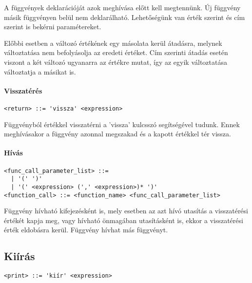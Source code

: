 A függvények deklarációját azok meghívása előtt kell megtennünk. Új függvény másik függvényen belül nem deklarálható. Lehetőségünk van érték szerint és cím szerint is bekérni paramétereket.

Előbbi esetben a változó értékének egy másolata kerül átadásra, melynek változtatása nem befolyásolja az eredeti értéket. Cím szerinti átadás esetén viszont a két változó ugyanarra az értékre mutat, így az egyik változtatása változtatja a másikat is.

\paragraph{Visszatérés}

\begin{footnotesize}
\begin{verbatim}
<return> ::= 'vissza' <expression>
\end{verbatim}
\end{footnotesize}

Függvényból értékkel visszatérni a 'vissza' kulcsszó segítségével tudunk. Ennek meghívásakor a függvény azonnal megszakad és a kapott értékkel tér vissza.

\paragraph{Hívás}

\begin{footnotesize}
\begin{verbatim}
<func_call_parameter_list> ::= 
  | '(' ')' 
  | '(' <expression> (',' <expression>)* ')'
<function_call> ::= <function_name> <func_call_parameter_list>
\end{verbatim}
\end{footnotesize}

Függvény hívható kifejezésként is, mely esetben az azt hívó utasítás a visszatérési értékét kapja meg, vagy hívható önmagában utasításként is, ekkor a visszatérési érték eldobásra kerül. Függvény hívhat más függvényt.

\subsection{Kiírás}

\begin{footnotesize}
\begin{verbatim}
<print> ::= 'kiír' <expression>
\end{verbatim}
\end{footnotesize}

